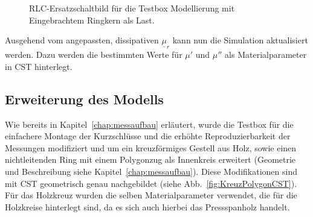                 \begin{figure}[htb]
                    \centering
                    \caption{RLC-Ersatzschaltbild f\"ur die Testbox Modellierung mit Eingebrachtem Ringkern als Last.}
                    \label{fig:BoxRKCircuit}
                \end{figure}
                
            Ausgehend vom angepassten, dissipativen $\underline{\mu}_r$ kann nun die Simulation aktualisiert werden. Dazu werden die bestimmten Werte für $\mu'$ und $\mu''$ als Materialparameter in CST hinterlegt.
           
        \subsection{Erweiterung des Modells}
        Wie bereits in Kapitel~\ref{chap:messaufbau} erläutert, wurde die Testbox für die einfachere Montage der Kurzschlüsse und die erhöhte Reproduzierbarkeit der Messungen modifiziert und um ein kreuzförmiges Gestell aus Holz, sowie einen nichtleitenden Ring mit einem Polygonzug als Innenkreis erweitert (Geometrie und Beschreibung siehe Kapitel~\ref{chap:messaufbau}). Diese Modifikationen sind mit CST geometrisch genau nachgebildet (siehe Abb.~\ref{fig:KreuzPolygonCST}). Für das Holzkreuz wurden die selben Materialparameter verwendet, die für die Holzkreise hinterlegt sind, da es sich auch hierbei das Pressspanholz handelt.
        
